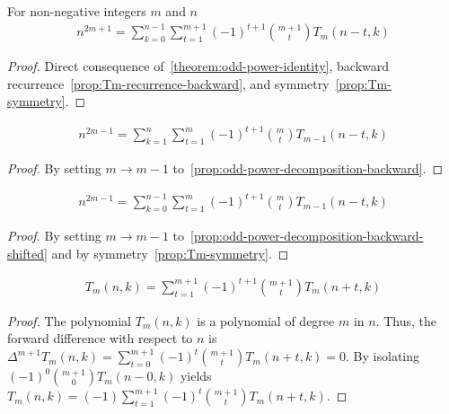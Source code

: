 \begin{proposition}
    \label{prop:odd-power-decomposition-backward-shifted}
    For non-negative integers $m$ and $n$
    \begin{align*}
        n^{2m+1} = \sum_{k=0}^{n-1} \sum_{t=1}^{m+1} (-1)^{t+1} \binom{m+1}{t} T_{m} (n-t, k)
    \end{align*}
    \begin{proof}
        Direct consequence of~\eqref{theorem:odd-power-identity},
        backward recurrence~\eqref{prop:Tm-recurrence-backward}, and symmetry~\eqref{prop:Tm-symmetry}.
    \end{proof}
\end{proposition}

\begin{corollary}
    \label{cor:odd-power-decomposition-m-1}
    \begin{align*}
        n^{2m-1} = \sum_{k=1}^{n} \sum_{t=1}^{m} (-1)^{t+1} \binom{m}{t} T_{m-1} (n-t, k)
    \end{align*}
    \begin{proof}
        By setting $m \rightarrow m-1$ to~\eqref{prop:odd-power-decomposition-backward}.
    \end{proof}
\end{corollary}

\begin{corollary}
    \label{cor:odd-power-decomposition-m-1-shifted}
    \begin{align*}
        n^{2m-1} = \sum_{k=0}^{n-1} \sum_{t=1}^{m} (-1)^{t+1} \binom{m}{t} T_{m-1} (n-t, k)
    \end{align*}
    \begin{proof}
        By setting $m \rightarrow m-1$ to~\eqref{prop:odd-power-decomposition-backward-shifted}
        and by symmetry~\eqref{prop:Tm-symmetry}.
    \end{proof}
\end{corollary}

\begin{proposition}
    \label{prop:Tm-recurrence-forward}
    \begin{align*}
        T_{m} (n,k) = \sum_{t=1}^{m+1} (-1)^{t+1} \binom{m+1}{t} T_{m} (n+t, k)
    \end{align*}
    \begin{proof}
        The polynomial $T_{m} (n,k)$ is a polynomial of degree $m$ in $n$.
        Thus, the forward difference with respect to $n$ is
        $\Delta^{m+1} T_{m} (n, k) = \sum_{t=0}^{m+1} (-1)^{t} \binom{m+1}{t} T_{m} (n+t, k) = 0$.
        By isolating $(-1)^{0} \binom{m+1}{0} T_{m} (n-0, k)$ yields
        $T_{m} (n, k) = (-1) \sum_{t=1}^{m+1} (-1)^{t} \binom{m+1}{t} T_{m} (n+t, k)$.
    \end{proof}
\end{proposition}

